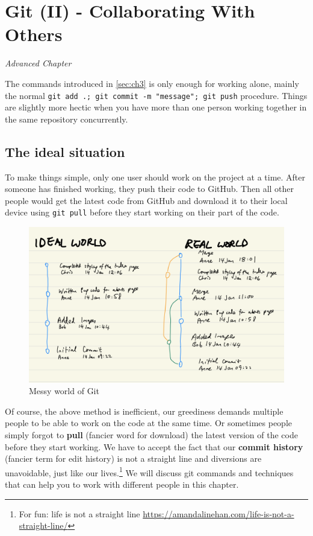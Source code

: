 \chapter{Git (II) - Collaborating With Others}
\label{sec:git2}

\textit{Advanced Chapter}
\vspace{6mm}

The commands introduced in \cref{sec:ch3} is only enough for working alone, mainly the normal \texttt{git add .; git commit -m "message"; git push} procedure. Things are slightly more hectic when you have more than one person working together in the same repository concurrently. 

\section{The ideal situation}

To make things simple, only one user should work on the project at a time. After someone has finished working, they push their code to GitHub. Then all other people would get the latest code from GitHub and download it to their local device using \texttt{git pull} before they start working on their part of the code. 

\begin{figure}[h]
\centering
\includegraphics[width=15cm]{images/ch8-messy-git-world.png}
\caption{Messy world of Git}
\end{figure}

Of course, the above method is inefficient, our greediness demands multiple people to be able to work on the code at the same time. Or sometimes people simply forgot to \textbf{pull} (fancier word for download) the latest version of the code before they start working. We have to accept the fact that our \textbf{commit history} (fancier term for edit history) is not a straight line and diversions are unavoidable, just like our lives.\footnote{For fun: life is not a straight line \url{https://amandalinehan.com/life-is-not-a-straight-line/}} We will discuss git commands and techniques that can help you to work with different people in this chapter.


